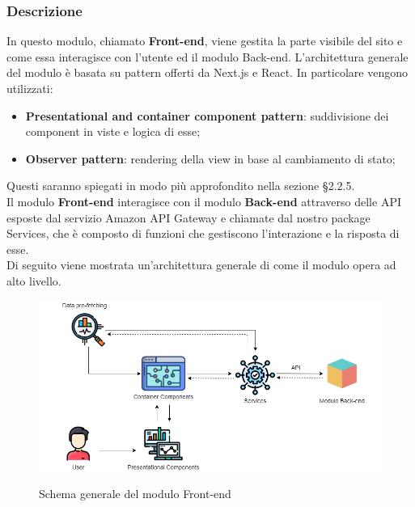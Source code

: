 \subsubsection{Descrizione}

In questo modulo, chiamato \textbf{Front-end}, viene gestita la parte visibile del sito \nameproject{} e come essa interagisce con l'utente ed il modulo Back-end. L'architettura generale del modulo è basata su pattern offerti da Next.js e React. In particolare vengono utilizzati:
\begin{itemize}
	\item \textbf{Presentational and container component pattern}: suddivisione dei component in viste e logica di esse;
	\item \textbf{Observer pattern}: rendering della view in base al cambiamento di stato;
\end{itemize} 
Questi saranno spiegati in modo più approfondito nella sezione \S{2.2.5}.\\
Il modulo \textbf{Front-end} interagisce con il modulo \textbf{Back-end} attraverso delle API esposte dal servizio Amazon API Gateway e chiamate dal nostro package Services, che è composto di funzioni che gestiscono l'interazione e la risposta di esse. \\
Di seguito viene mostrata un'architettura generale di come il modulo opera ad alto livello.

\vspace{1cm}

\begin{figure}[H]
\centering
\includegraphics[scale=0.50]{res/Architettura/Frontend/img/general_frontend}\\
\caption{Schema generale del modulo Front-end}
\end{figure}